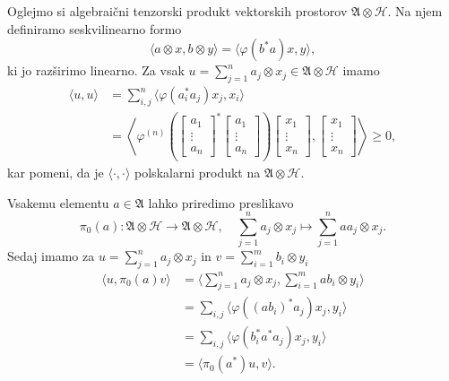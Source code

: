 \begin{dokaz}
    Oglejmo si algebraični tenzorski produkt vektorskih prostorov $\mathfrak{A} \otimes \mathcal{H}$.
    Na njem definiramo seskvilinearno formo 
    $$\langle a \otimes x, b \otimes y \rangle = \langle \varphi(b^* a) x, y\rangle,$$
    ki jo razširimo linearno. Za vsak $u = \sum_{j = 1} ^n a_j \otimes x_j \in \mathfrak{A} \otimes \mathcal{H}$ imamo
    \begin{align*}
        \langle u, u \rangle &= \sum_{i, j} ^n \langle \varphi(a_i ^* a_j)x_j,x_i \rangle\\
        &= \left\langle \varphi^{(n)} \left(\begin{bmatrix}
            a_1 \\ \vdots \\ a_n
        \end{bmatrix}^* \begin{bmatrix}
            a_1 \\ \vdots \\ a_n
        \end{bmatrix}\right) \begin{bmatrix}
           x_1 \\ \vdots \\x_n
        \end{bmatrix}, \begin{bmatrix}
           x_1 \\ \vdots \\x_n
        \end{bmatrix} \right\rangle \geq 0,
    \end{align*}
    kar pomeni, da je $\langle \cdot, \cdot \rangle$ polskalarni produkt na $\mathfrak{A} \otimes \mathcal{H}$. 

    Vsakemu elementu $a \in \mathfrak{A}$ lahko priredimo preslikavo
    $$\pi_0 (a): \mathfrak{A} \otimes \mathcal{H} \to \mathfrak{A} \otimes \mathcal{H},\quad \sum_{j = 1} ^n a_j \otimes x_j \mapsto \sum_{j = 1} ^n a a_j \otimes x_j.$$
    Sedaj imamo za $u = \sum_{j = 1} ^n a_j \otimes x_j$ in $v = \sum_{i = 1} ^m b_i \otimes y_i$
    \begin{align}
        \langle u, \pi_0 (a) v \rangle &= \langle \sum_{j = 1} ^n a_j \otimes x_j, \sum_{i = 1} ^m a b_i \otimes y_i \rangle \nonumber\\ 
        &= \sum_{i, j} \langle \varphi((a b_i)^* a_j)x_j, y_i \rangle \nonumber\\
        &= \sum_{i, j} \langle \varphi (b_i ^* a^* a_j ) x_j, y_i \rangle \nonumber\\
        &= \langle \pi_0 (a^*) u, v \rangle. \label{eq:1.4}
    \end{align}


\end{dokaz}
